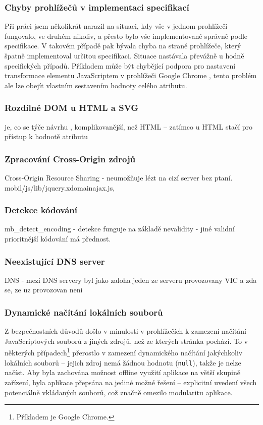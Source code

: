 \subsubsection{Chyby prohlížečů v implementaci specifikací}
Při práci jsem několikrát narazil na situaci, kdy vše v jednom prohlížeči fungovalo, ve druhém nikoliv, a přesto bylo vše implementované správně podle specifikace. V takovém případě pak bývala chyba na straně prohlížeče, který špatně implementoval určitou specifikaci. Situace nastávala převážně u hodně specifických případů. Příkladem může být chybějící podpora pro nastavení transformace  elementu JavaScriptem v prohlížeči Google Chrome \cite{BugChromeTran}, tento problém ale lze obejít vlastním sestavením hodnoty celého atributu. 

\subsubsection{Rozdílné DOM u HTML a SVG}
 je, co se týče návrhu , komplikovanější, než HTML -- zatímco u HTML stačí pro přístup k hodnotě atributu 

\subsubsection{Zpracování Cross-Origin zdrojů}
\label{sec:mobil:cross-origin}
Cross-Origin Resource Sharing - neumožňuje lézt na cizí server bez ptaní.
mobil/js/lib/jquery.xdomainajax.js, 

\subsubsection{Detekce kódování}
mb\_detect\_encoding - detekce funguje na základě nevalidity - jiné validní prioritnější kódování má přednost.

\subsubsection{Neexistující DNS server}
DNS - mezi DNS servery byl jako zaloha jeden ze serveru provozovany VIC a zda se, ze uz provozovan neni

\subsubsection{Dynamické načítání lokálních souborů}
Z bezpečnostních důvodů došlo v minulosti v prohlížečích k zamezení načítání JavaScriptových souborů z jiných zdrojů, než ze kterých stránka pochází. To v některých případech\footnote{Příkladem je Google Chrome.} přerostlo v zamezení dynamického načítání jakýchkoliv lokálních souborů -- jejich zdroj nemá žádnou hodnotu (\texttt{null}), takže je nelze načíst. Aby byla zachována možnost offline využití aplikace na větší skupině zařízení, byla aplikace přepsána na jediné možné řešení -- explicitní uvedení všech potenciálně vkládaných souborů, což značně omezilo modularitu aplikace.

